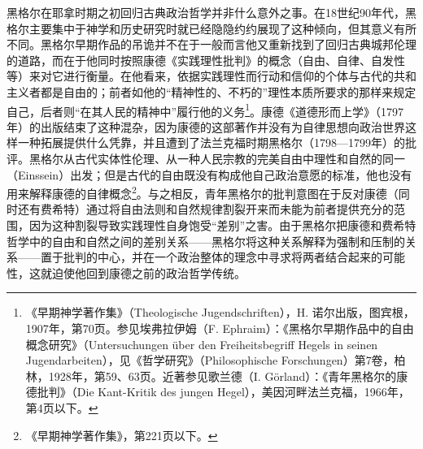 黑格尔在耶拿时期之初回归古典政治哲学并非什么意外之事。在18世纪90年代，黑格尔主要集中于神学和历史研究时就已经隐隐约约展现了这种倾向，但其意义有所不同。黑格尔早期作品的吊诡并不在于一般而言他又重新找到了回归古典城邦伦理的道路，而在于他同时按照康德《实践理性批判》的概念（自由、自律、自发性等）来对它进行衡量。在他看来，依据实践理性而行动和信仰的个体与古代的共和主义者都是自由的；前者如他的“精神性的、不朽的”理性本质所要求的那样来规定自己，后者则“在其人民的精神中”履行他的义务\footnote{《早期神学著作集》（Theologische Jugendschriften），H. 诺尔出版，图宾根，1907年，第70页。参见埃弗拉伊姆（F. Ephraim）：《黑格尔早期作品中的自由概念研究》（Untersuchungen über den Freiheitsbegriff Hegels in seinen Jugendarbeiten），见《哲学研究》（Philosophische Forschungen）第7卷，柏林，1928年，第59、63页。近著参见歌兰德（I. Görland）：《青年黑格尔的康德批判》（Die Kant-Kritik des jungen Hegel），美因河畔法兰克福，1966年，第4页以下。}。康德《道德形而上学》（1797年）的出版结束了这种混杂，因为康德的这部著作并没有为自律思想向政治世界这样一种拓展提供什么凭靠，并且遭到了法兰克福时期黑格尔（1798—1799年）的批评。黑格尔从古代实体性伦理、从一种人民宗教的完美自由中理性和自然的同一（Einssein）出发；但是古代的自由既没有构成他自己政治意愿的标准，他也没有用来解释康德的自律概念\footnote{《早期神学著作集》，第221页以下。}。与之相反，青年黑格尔的批判意图在于反对康德（同时还有费希特）通过将自由法则和自然规律割裂开来而未能为前者提供充分的范围，因为这种割裂导致实践理性自身饱受“差别”之害。由于黑格尔把康德和费希特哲学中的自由和自然之间的差别关系——黑格尔将这种关系解释为强制和压制的关系——置于批判的中心，并在一个政治整体的理念中寻求将两者结合起来的可能性，这就迫使他回到康德之前的政治哲学传统。

